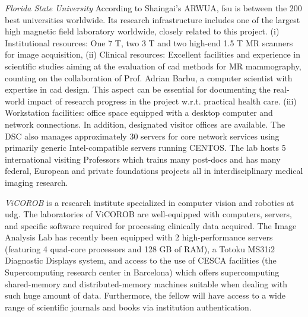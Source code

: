 \emph{Florida State University} 
According to Shaingai's ARWUA, \ac{fsu} is between the 200 best universities worldwide. 
Its research infrastructure includes one of the largest high magnetic field laboratory worldwide, closely related to this project. 
(i) Institutional resources: One 7 T, two 3 T and two high-end 1.5 T MR scanners for image acquisition,
(ii) Clinical resources: Excellent facilities and experience in scientific studies aiming at the evaluation of \ac{cad} methods for MR mammography, counting on the collaboration of Prof. Adrian Barbu, a computer scientist with expertise in \ac{cad} design. 
This aspect can be essential for documenting the real-world impact of research progress in the project w.r.t. practical health care. 
(iii) Workstation facilities: office space equipped with a desktop computer and network connections. 
In addition, designated visitor offices are available. 
The DSC also manages approximately 30 servers for core network services using primarily generic Intel-compatible servers running CENTOS. 
The lab hosts 5 international visiting Professors which trains many post-docs and has many federal, European and private foundations projects all in interdisciplinary medical imaging research.

\emph{ViCOROB} is a research institute specialized in computer vision and robotics at \ac{udg}.
The laboratories of ViCOROB are well-equipped with computers, servers, and specific software required for processing clinically data acquired. 
The Image Analysis Lab has recently been equipped with 2 high-performance servers (featuring 4 quad-core processors and 128 GB of RAM), a Totoku MS31i2 Diagnostic Displays system, and access to the use of CESCA facilities (the Supercomputing research center in Barcelona) which offers supercomputing shared-memory and distributed-memory machines suitable when dealing with such huge amount of data.
Furthermore, the fellow will have access to a wide range of scientific journals and books via institution authentication.



